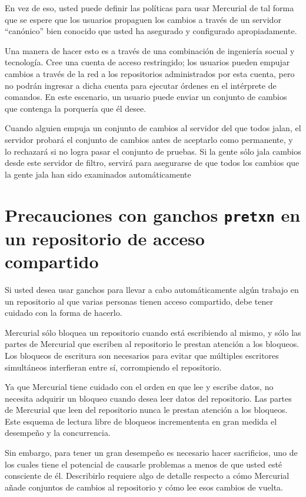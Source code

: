 En vez de eso, usted puede definir las políticas para usar Mercurial
de tal forma que se espere que los usuarios propaguen los cambios a
través de un servidor ``canónico'' bien conocido que usted ha
asegurado y configurado apropiadamente.

Una manera de hacer esto es a través de una combinación de ingeniería
socual y tecnología. Cree una cuenta de acceso restringido; los
usuarios pueden empujar cambios a través de la red a los repositorios
administrados por esta cuenta, pero no podrán ingresar a dicha cuenta
para ejecutar órdenes en el intérprete de comandos. En este escenario,
un usuario puede enviar un conjunto de cambios que contenga la
porquería que él desee.

Cuando alguien empuja un conjunto de cambios al servidor del que todos
jalan, el servidor probará el conjunto de cambios antes de aceptarlo
como permanente, y lo rechazará si no logra pasar el conjunto de
pruebas. Si la gente sólo jala cambios desde este servidor de filtro,
servirá para asegurarse de que todos los cambios que la gente jala han
sido examinados automáticamente

\section{Precauciones con ganchos \texttt{pretxn} en un repositorio de
acceso compartido}

Si usted desea usar ganchos para llevar a cabo automáticamente algún
trabajo en un repositorio al que varias personas tienen acceso
compartido, debe tener cuidado con la forma de hacerlo.

Mercurial sólo bloquea un repositorio cuando está escribiendo al
mismo, y sólo las partes de Mercurial que escriben al repositorio le
prestan atención a los bloqueos. Los bloqueos de escritura son
necesarios para evitar que múltiples escritores simultáneos
interfieran entre sí, corrompiendo el repositorio.

Ya que Mercurial tiene cuidado con el orden en que lee y escribe
datos, no necesita adquirir un bloqueo cuando desea leer datos del
repositorio. Las partes de Mercurial que leen del repositorio nunca le
prestan atención a los bloqueos. Este esquema de lectura libre de
bloqueos incremententa en gran medida el desempeño y la concurrencia.

Sin embargo, para tener un gran desempeño es necesario hacer
sacrificios, uno de los cuales tiene el potencial de causarle
problemas a menos de que usted esté consciente de él. Describirlo
requiere algo de detalle respecto a cómo Mercurial añade conjuntos de
cambios al repositorio y cómo lee esos cambios de vuelta.

